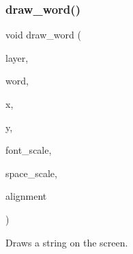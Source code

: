 \subsubsection{\texorpdfstring{draw\+\_\+word()}{draw\_word()}}
{\footnotesize\ttfamily void draw\+\_\+word (\begin{DoxyParamCaption}\item[{\mbox{\hyperlink{struct_layer}{Layer}} $\ast$}]{layer,  }\item[{char $\ast$}]{word,  }\item[{int16\+\_\+t}]{x,  }\item[{int16\+\_\+t}]{y,  }\item[{uint16\+\_\+t}]{font\+\_\+scale,  }\item[{uint16\+\_\+t}]{space\+\_\+scale,  }\item[{\mbox{\hyperlink{group__textbox_gaa56f1a82069b5feeadbb4591cb3e474f}{Text\+Alignment}}}]{alignment }\end{DoxyParamCaption})}



Draws a string on the screen. 


